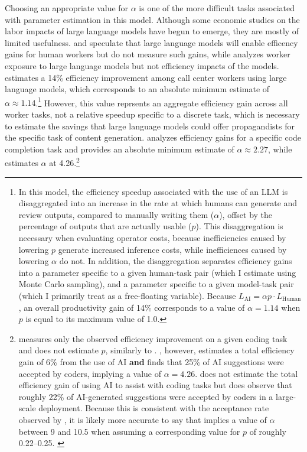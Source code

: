 \documentclass{article}
\begin{document}
Choosing an appropriate value for $\alpha$ is one of the more difficult tasks associated with parameter estimation in this model. Although some economic studies on the labor impacts of large language models have begun to emerge, \cite{brynjolfsson, codemodels, gptsasgpts, github, korinek, googleproductivity} they are mostly of limited usefulness. \cite{codemodels} and \cite{korinek} speculate that large language models will enable efficency gains for human workers but do not measure such gains, while \cite{gptsasgpts} analyzes worker exposure to large language models but not efficiency impacts of the models. \cite{brynjolfsson} estimates a 14\% efficiency improvement among call center workers using large language models, which corresponds to an absolute minimum estimate of $\alpha \approx 1.14$.\footnote{In this model, the efficiency speedup associated with the use of an LLM is disaggregated into an increase in the rate at which humans can generate and review outputs, compared to manually writing them ($\alpha$), offset by the percentage of outputs that are actually usable ($p$). This disaggregation is necessary when evaluating operator costs, because inefficiencies caused by lowering $p$ generate increased inference costs, while inefficiences caused by lowering $\alpha$ do not. In addition, the disaggregation separates efficiency gains into a parameter specific to a given human-task pair (which I estimate using Monte Carlo sampling), and a parameter specific to a given model-task pair (which I primarily treat as a free-floating variable). Because $L_{\text{AI}} = \alpha p \cdot L_{\text{Human}}$, an overall productivity gain of 14\% corresponds to a value of $\alpha = 1.14$ when $p$ is equal to its maximum value of 1.0.} However, this value reprsents an aggregate efficiency gain across all worker tasks, not a relative speedup specific to a discrete task, which is necessary to estimate the savings that large language models could offer propagandists for the specific task of content generation. \cite{github} analyzes efficiency gains for a specific code completion task and provides an absolute minimum estimate of $\alpha \approx 2.27$, while \cite{googleproductivity} estimates $\alpha$ at 4.26.\footnote{\cite{github} measures only the observed efficiency improvement on a given coding task and does not estimate $p$, similarly to \cite{brynjolfsson}. \cite{googleproductivity}, however, estimates a total efficiency gain of 6\% from the use of AI \textbf{and} finds that 25\% of AI suggestions were accepted by coders, implying a value of $\alpha = 4.26$. \cite{meta} does not estimate the total efficiency gain of using AI to assist with coding tasks but does observe that roughly 22\% of AI-generated suggestions were accepted by coders in a large-scale deployment. Because this is consistent with the acceptance rate observed by \cite{googleproductivity}, it is likely more accurate to say that \cite{github} implies a value of $\alpha$ between 9 and 10.5 when assuming a corresponding value for $p$ of roughly 0.22–0.25. \label{efficiency}}
\end{document}
